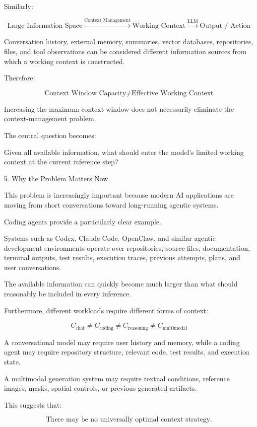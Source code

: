 Similarly:

$$ \text{Large Information Space} \xrightarrow{\text{Context Management}} \boxed{\text{Working Context}} \xrightarrow{\text{LLM}} \text{Output / Action} $$

Conversation history, external memory, summaries, vector databases, repositories, files, and tool observations can be considered different information sources from which a working context is constructed.

Therefore:

$$ \boxed{ \text{Context Window Capacity} \neq \text{Effective Working Context} } $$

Increasing the maximum context window does not necessarily eliminate the context-management problem.

The central question becomes:

Given all available information, what should enter the model's limited working context at the current inference step?

5. Why the Problem Matters Now

This problem is increasingly important because modern AI applications are moving from short conversations toward long-running agentic systems.

Coding agents provide a particularly clear example.

Systems such as Codex, Claude Code, OpenClaw, and similar agentic development environments operate over repositories, source files, documentation, terminal outputs, test results, execution traces, previous attempts, plans, and user conversations.

The available information can quickly become much larger than what should reasonably be included in every inference.

Furthermore, different workloads require different forms of context:

$$ C_{\text{chat}} \neq C_{\text{coding}} \neq C_{\text{reasoning}} \neq C_{\text{multimodal}} $$

A conversational model may require user history and memory, while a coding agent may require repository structure, relevant code, test results, and execution state.

A multimodal generation system may require textual conditions, reference images, masks, spatial controls, or previous generated artifacts.

This suggests that:

$$ \boxed{ \text{There may be no universally optimal context strategy.} } $$

